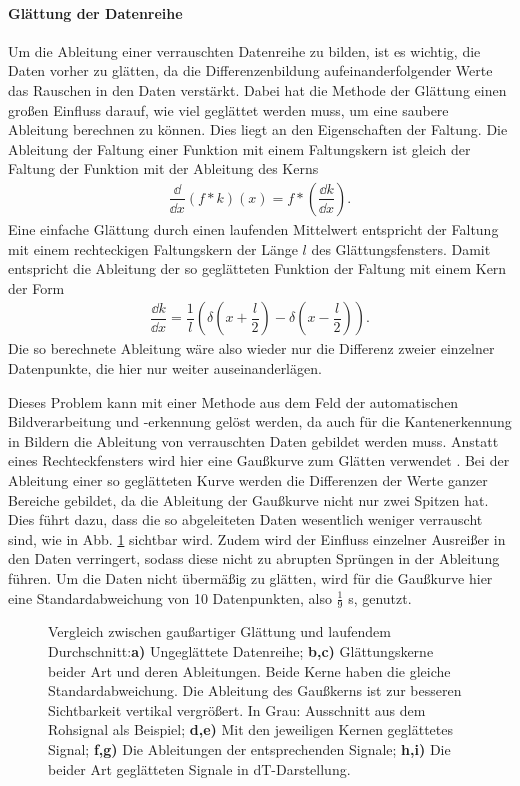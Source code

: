 \paragraph{Glättung der Datenreihe}
Um die Ableitung einer verrauschten Datenreihe zu bilden, ist es wichtig, die Daten vorher zu glätten, da die Differenzenbildung aufeinanderfolgender Werte das Rauschen in den Daten verstärkt. Dabei hat die Methode der Glättung einen großen Einfluss darauf, wie viel geglättet werden muss, um eine saubere Ableitung berechnen zu können. Dies liegt an den Eigenschaften der Faltung. Die Ableitung der Faltung einer Funktion mit einem Faltungskern ist gleich der Faltung der Funktion mit der Ableitung des Kerns \cite{forsythdavidComputerVisionModern2012}
\begin{align*}
	\dfrac{\dd }{\dd x} (f*k)(x) = f*\left(\!\dfrac{\dd k}{\dd x}\right).
\end{align*}
Eine einfache Glättung durch einen laufenden Mittelwert entspricht der Faltung mit einem rechteckigen Faltungskern der Länge $ l $ des Glättungsfensters. Damit entspricht die Ableitung der so geglätteten Funktion der Faltung mit einem Kern der Form
\begin{align*}
	\dfrac{\dd k}{\dd x} = \dfrac{1}{l} \left(\delta\left(x+ \dfrac{l}{2}\right) -\delta\left(x- \dfrac{l}{2}\right)\right).
\end{align*}
Die so berechnete Ableitung wäre also wieder nur die Differenz zweier einzelner Datenpunkte, die hier nur weiter auseinanderlägen.

Dieses Problem kann mit einer Methode aus dem Feld der automatischen Bildverarbeitung und -erkennung gelöst werden, da auch für die Kantenerkennung in Bildern die Ableitung von verrauschten Daten gebildet werden muss. Anstatt eines Rechteckfensters wird hier eine Gaußkurve zum Glätten verwendet \cite{forsythdavidComputerVisionModern2012,dengAdaptiveGaussianFilter1993}. Bei der Ableitung einer so geglätteten Kurve werden die Differenzen der Werte ganzer Bereiche gebildet, da die Ableitung der Gaußkurve nicht nur zwei Spitzen hat. Dies führt dazu, dass die so abgeleiteten Daten wesentlich weniger verrauscht sind, wie in Abb. \ref{fig:gaussglaettung} sichtbar wird. Zudem wird der Einfluss einzelner Ausreißer in den Daten verringert, sodass diese nicht zu abrupten Sprüngen in der Ableitung führen.
Um die Daten nicht übermäßig zu glätten, wird für die Gaußkurve hier eine Standardabweichung von 10 Datenpunkten, also $ \frac{1}{9} $ s, genutzt.

\begin{figure}[p]
\centering

\caption{Vergleich zwischen gaußartiger Glättung und laufendem Durchschnitt:\textbf{a)} Ungeglättete Datenreihe; \textbf{b,c)} Glättungskerne beider Art und deren Ableitungen. Beide Kerne haben die gleiche Standardabweichung. Die Ableitung des Gaußkerns ist zur besseren Sichtbarkeit vertikal vergrößert. In Grau: Ausschnitt aus dem Rohsignal als Beispiel; \textbf{d,e)} Mit den jeweiligen Kernen geglättetes Signal; \textbf{f,g)} Die Ableitungen der entsprechenden Signale; \textbf{h,i)} Die beider Art geglätteten Signale in dT-Darstellung.}
\label{fig:gaussglaettung}
\end{figure}

